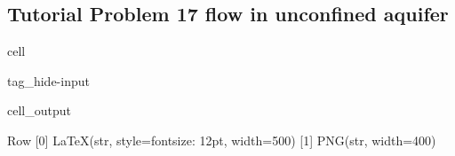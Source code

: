 \documentclass[letterpaper,10pt,english]{jupyterBook}
\begin{document}
\subsection{Tutorial Problem 17\sphinxhyphen{} flow in unconfined aquifer}
\label{\detokenize{content/tutorials/T6/tutorial_06:tutorial-problem-17-flow-in-unconfined-aquifer}}
\begin{sphinxuseclass}{cell}
\begin{sphinxuseclass}{tag_hide-input}\begin{sphinxVerbatimOutput}

\begin{sphinxuseclass}{cell_output}
\begin{sphinxVerbatim}[commandchars=\\\{\}]
Row
    [0] LaTeX(str, style=\PYGZob{}\PYGZsq{}font\PYGZhy{}size\PYGZsq{}: \PYGZsq{}12pt\PYGZsq{}\PYGZcb{}, width=500)
    [1] PNG(str, width=400)
\end{sphinxVerbatim}

\end{sphinxuseclass}\end{sphinxVerbatimOutput}

\end{sphinxuseclass}
\end{sphinxuseclass}
\end{document}
